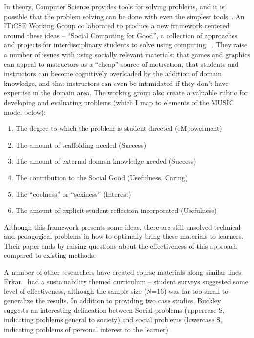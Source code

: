 In theory, Computer Science provides tools for solving problems, and it is possible that the problem solving can be done with even the simplest tools~\cite{Layman:2007, Social-good}.
An ITiCSE Working Group collaborated to produce a new framework centered around these ideas -- ``Social Computing for Good'', a collection of approaches and projects for interdisciplinary students to solve using computing ~\cite{Social-good}.
They raise a number of issues with using socially relevant materials: that games and graphics can appeal to instructors as a ``cheap'' source of motivation, that students and instructors can become cognitively overloaded by the addition of domain knowledge, and that instructors can even be intimidated if they don't have expertise in the domain area.
The working group also create a valuable rubric for developing and evaluating problems (which I map to elements of the MUSIC model below):
\begin{enumerate}
	\item The degree to which the problem is student-directed (eMpowerment)
	\item The amount of scaffolding needed (Success)
	\item The amount of external domain knowledge needed (Success)
	\item The contribution to the Social Good (Usefulness, Caring)
	\item The ``coolness'' or ``sexiness'' (Interest)
	\item The amount of explicit student reflection incorporated (Usefulness)
\end{enumerate}
Although this framework presents some ideas, there are still unsolved technical and pedagogical problems in how to optimally bring these materials to learners. Their paper ends by raising questions about the effectiveness of this approach compared to existing methods.

A number of other researchers have created course materials along similar lines.
Erkan~\cite{Erkan:2012} had a sustainability themed curriculum -- student surveys suggested some level of effectiveness, although the sample size (N=16) was far too small to generalize the results.
In addition to providing two case studies, Buckley ~\cite{Buckley:2008} suggests an interesting delineation between Social problems (uppercase S, indicating problems general to society) and social problems (lowercase S, indicating problems of personal interest to the learner).

